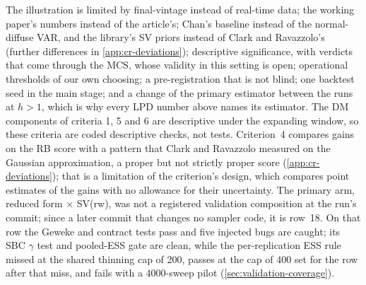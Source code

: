 The illustration is limited by final-vintage instead of real-time data; the working
paper's numbers instead of the article's; Chan's  baseline instead of the
normal-diffuse VAR, and the library's SV priors instead of Clark and Ravazzolo's (further
differences in \cref{app:cr-deviations}); descriptive significance, with verdicts that come through
the MCS, whose validity in this setting is open; operational thresholds of our own choosing;
a pre-registration that is not blind; one backtest seed in the main stage; and a change of the
primary estimator between the runs at $h > 1$, which is why every LPD number above names its
estimator.
The DM components of criteria 1, 5 and 6 are descriptive under the expanding window, so these
criteria are coded descriptive checks, not tests. %
Criterion~4 compares gains on the RB score with a pattern that Clark and Ravazzolo measured on the
Gaussian approximation, a proper but not strictly proper score (\cref{app:cr-deviations}); that is
a limitation of the criterion's design, which compares point estimates of the gains with no
allowance for their uncertainty. %
The primary arm, reduced form $\times$ SV(rw), was not a registered validation composition at the
run's commit; since a later commit that changes no sampler code, it is row~18. %
On that row the Geweke and contract tests pass and five injected bugs are caught; its SBC
$\gamma$ test and pooled-ESS gate are clean, while the per-replication ESS rule missed at the shared
thinning cap of 200, passes at the cap of 400 set for the row after that miss, and fails with a
4000-sweep pilot (\cref{sec:validation-coverage}). %
